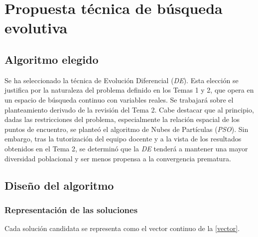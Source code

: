 \newpage
{}
\section*{Propuesta técnica de búsqueda evolutiva}

\subsection*{Algoritmo elegido}
Se ha seleccionado la técnica de Evolución Diferencial (\textit{DE}). 
Esta elección se justifica por la naturaleza del problema definido en los Temas 1 y 2, 
que opera en un espacio de búsqueda continuo con variables 
reales. Se trabajará sobre el planteamiento derivado de la revisión del Tema 2.
Cabe destacar que al principio, dadas las restricciones del problema, especialmente 
la relación espacial de los puntos de encuentro, se planteó el algoritmo 
de Nubes de Partículas (\textit{PSO}). Sin embargo, tras la tutorización del equipo
docente y a la vista de los resultados obtenidos en el Tema 2, se determinó 
que la \textit{DE} tenderá a mantener una mayor diversidad poblacional 
y ser menos propensa a la convergencia prematura. 


\subsection*{Diseño del algoritmo}
\subsubsection*{Representación de las soluciones}
Cada solución candidata se representa como el vector continuo de la \autoref{vector}.

